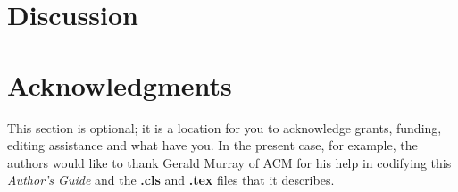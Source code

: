 \documentclass{acm_proc_article-sp}
\begin{document}
\section{Discussion}

\section{Acknowledgments}
This section is optional; it is a location for you
to acknowledge grants, funding, editing assistance and
what have you.  In the present case, for example, the
authors would like to thank Gerald Murray of ACM for
his help in codifying this \textit{Author's Guide}
and the \textbf{.cls} and \textbf{.tex} files that it describes.

%

%
\end{document}
